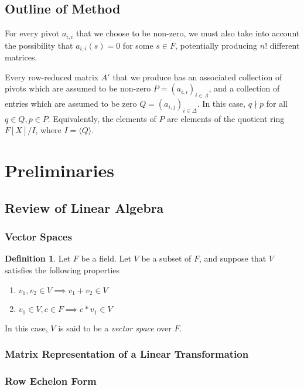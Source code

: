 \documentclass{amsart}
\theoremstyle{definition}
\newtheorem{definition}[theorem]{Definition}
\theoremstyle{remark}
\numberwithin{equation}{section}
\begin{document}
\subsection{Outline of Method}

For every pivot $a_{i,i}$ that we choose to be non-zero, we must also take into account the possibility that $a_{i,i}(s) = 0$ for some $s \in F$, potentially producing $n!$ different matrices.

Every row-reduced matrix $A'$ that we produce has an associated collection of pivots which are assumed to be non-zero $P = (a_{i,i})_{i \in \Lambda}$, and a collection of entries which are assumed to be zero $Q = (a_{i,j})_{i \in \Delta}$. In this case, $q \nmid p$ for all $q \in Q, p \in P$. Equivalently, the elements of $P$ are elements of the quotient ring $F[X]/I$, where $I = \langle Q \rangle$.

\section{Preliminaries}
\label{sec:preliminaries}

\subsection{Review of Linear Algebra}

\subsubsection{Vector Spaces}

\begin{definition}
    Let $F$ be a field. Let $V$ be a subset of $F$, and suppose that $V$
    satisfies the following properties
    \begin{enumerate}[i]
        \item $v_1, v_2 \in V \implies v_1 + v_2 \in V$
        \item $v_1 \in V, c \in F \implies c * v_1 \in V$
    \end{enumerate}
    In this case, $V$ is said to be a \emph{vector space} over $F$.
\end{definition}

\subsubsection{Matrix Representation of a Linear Transformation}

\subsubsection{Row Echelon Form}
\end{document}
